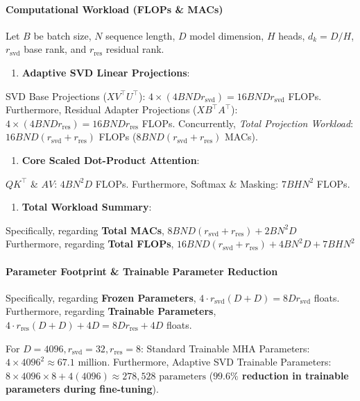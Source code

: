 \paragraph{Computational Workload (FLOPs \& MACs)}
Let $B$ be batch size, $N$ sequence length, $D$ model dimension, $H$ heads, $d_k = D/H$, $r_{\text{svd}}$ base rank, and $r_{\text{res}}$ residual rank.

\begin{enumerate}
\item \textbf{Adaptive SVD Linear Projections}:
\end{enumerate}
SVD Base Projections ($X V^\top U^\top$): $4 \times (4 B N D r_{\text{svd}}) = 16 B N D r_{\text{svd}}$ FLOPs. Furthermore, Residual Adapter Projections ($X B^\top A^\top$): $4 \times (4 B N D r_{\text{res}}) = 16 B N D r_{\text{res}}$ FLOPs. Concurrently, \textit{Total Projection Workload}: $16 B N D (r_{\text{svd}} + r_{\text{res}})$ FLOPs ($8 B N D (r_{\text{svd}} + r_{\text{res}})$ MACs).


\begin{enumerate}
\item \textbf{Core Scaled Dot-Product Attention}:
\end{enumerate}
$Q K^\top$ \& $A V$: $4 B N^2 D$ FLOPs. Furthermore, Softmax \& Masking: $7 B H N^2$ FLOPs.


\begin{enumerate}
\item \textbf{Total Workload Summary}:
\end{enumerate}
Specifically, regarding \textbf{Total MACs}, $8 B N D (r_{\text{svd}} + r_{\text{res}}) + 2 B N^2 D$ Furthermore, regarding \textbf{Total FLOPs}, $16 B N D (r_{\text{svd}} + r_{\text{res}}) + 4 B N^2 D + 7 B H N^2$


\paragraph{Parameter Footprint \& Trainable Parameter Reduction}
Specifically, regarding \textbf{Frozen Parameters}, $4 \cdot r_{\text{svd}}(D + D) = 8 D r_{\text{svd}}$ floats. Furthermore, regarding \textbf{Trainable Parameters}, $4 \cdot r_{\text{res}}(D + D) + 4 D = 8 D r_{\text{res}} + 4 D$ floats.

For $D = 4096, r_{\text{svd}} = 32, r_{\text{res}} = 8$:
Standard Trainable MHA Parameters: $4 \times 4096^2 \approx 67.1 \text{ million}$. Furthermore, Adaptive SVD Trainable Parameters: $8 \times 4096 \times 8 + 4(4096) \approx 278,528 \text{ parameters}$ (\textbf{$99.6\%$ reduction in trainable parameters during fine-tuning}).



